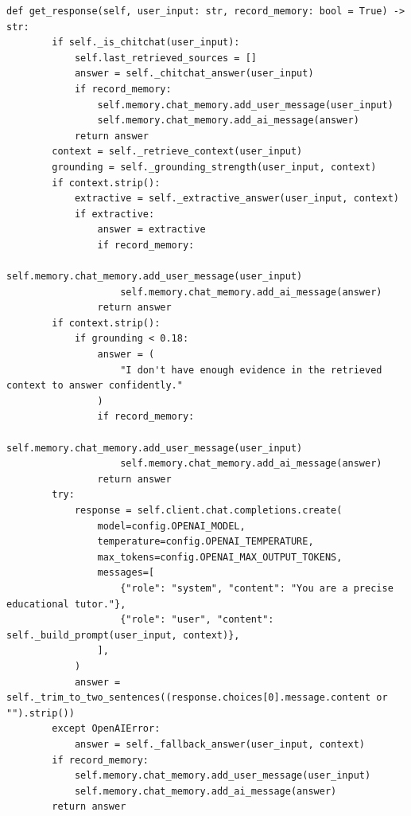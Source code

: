 \documentclass[12pt,a4paper]{article}
\begin{document}
\begin{lstlisting}[caption={tutor\_engine.py}]
    def get_response(self, user_input: str, record_memory: bool = True) -> str:
        if self._is_chitchat(user_input):
            self.last_retrieved_sources = []
            answer = self._chitchat_answer(user_input)
            if record_memory:
                self.memory.chat_memory.add_user_message(user_input)
                self.memory.chat_memory.add_ai_message(answer)
            return answer
        context = self._retrieve_context(user_input)
        grounding = self._grounding_strength(user_input, context)
        if context.strip():
            extractive = self._extractive_answer(user_input, context)
            if extractive:
                answer = extractive
                if record_memory:
                    self.memory.chat_memory.add_user_message(user_input)
                    self.memory.chat_memory.add_ai_message(answer)
                return answer
        if context.strip():
            if grounding < 0.18:
                answer = (
                    "I don't have enough evidence in the retrieved context to answer confidently."
                )
                if record_memory:
                    self.memory.chat_memory.add_user_message(user_input)
                    self.memory.chat_memory.add_ai_message(answer)
                return answer
        try:
            response = self.client.chat.completions.create(
                model=config.OPENAI_MODEL,
                temperature=config.OPENAI_TEMPERATURE,
                max_tokens=config.OPENAI_MAX_OUTPUT_TOKENS,
                messages=[
                    {"role": "system", "content": "You are a precise educational tutor."},
                    {"role": "user", "content": self._build_prompt(user_input, context)},
                ],
            )
            answer = self._trim_to_two_sentences((response.choices[0].message.content or "").strip())
        except OpenAIError:
            answer = self._fallback_answer(user_input, context)
        if record_memory:
            self.memory.chat_memory.add_user_message(user_input)
            self.memory.chat_memory.add_ai_message(answer)
        return answer
\end{lstlisting}
\end{document}
